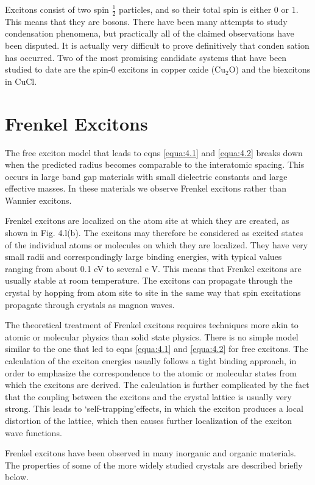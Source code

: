 \documentclass[12pt]{book}
\begin{document}
Excitons consist of two spin $\frac{1}{2}$ particles, and so their total spin is either $0$ or $1$. This means that they are bosons. There have been many attempts to study condensation phenomena, but practically all of the claimed observations have been disputed. It is actually very difficult to prove definitively that conden­ sation has occurred. Two of the most promising candidate systems that have been  studied to date are the spin-$0$ excitons in copper oxide ($\mathrm{Cu_2O}$) and the biexcitons in CuCl.

\section{Frenkel Excitons}

The free exciton model that leads to eqns \ref{equa:4.1} and \ref{equa:4.2} breaks down when the predicted radius becomes comparable to the interatomic spacing. This occurs in large band gap materials with small dielectric constants and large effective masses. In these materials we observe Frenkel excitons rather than Wannier excitons.

Frenkel excitons are localized on the atom site at which they are created, as shown in Fig. 4.l(b). The excitons may therefore be considered as excited states of the individual atoms or molecules on which they are localized. They have very small radii and correspondingly large binding energies, with typical values ranging from about 0.1 eV to several e V. This means that Frenkel excitons are usually stable at room temperature. The excitons can propagate through the crystal by hopping from atom site to site in the same way that spin excitations propagate through crystals as magnon waves.

The theoretical treatment of Frenkel excitons requires techniques more akin to atomic or molecular physics than solid state physics. There is no simple model similar to the one that led to eqns \ref{equa:4.1} and \ref{equa:4.2} for free excitons. The calculation of the exciton energies usually follows a tight binding approach, in order to emphasize the correspondence to the atomic or molecular states from which the excitons are derived. The calculation is further complicated by the fact that the coupling between the excitons and the crystal lattice is usually very strong. This leads to \lq self-trapping\rq effects, in which the exciton produces a local distortion of the lattice, which then causes further localization of the exciton wave functions.

Frenkel excitons have been observed in many inorganic and organic materials. The properties of some of the more widely studied crystals are described briefly below.
\end{document}
